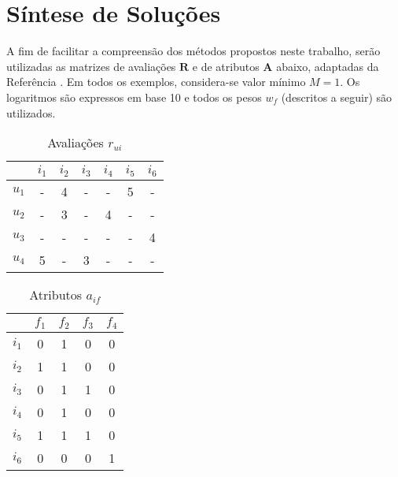 \chapter[Síntese de Soluções]{Síntese de Soluções}
\label{chap:sintese_de_solucoes}

A fim de facilitar a compreensão dos métodos propostos neste trabalho, serão utilizadas as matrizes de avaliações $\mathbf{R}$ e de atributos $\mathbf{A}$ abaixo, adaptadas da Referência . Em todos os exemplos, considera-se valor mínimo $M=1$. Os logaritmos são expressos em base 10 e todos os pesos $w_f$ (descritos a seguir) são utilizados.

\begin{table}[h]
\begin{center}
    \caption{Avaliações $r_{ui}$}
    \label{tab:rui_ref}
    \begin{tabular}{ | c | c | c | c | c | c | c | } 
    \hline
     & $i_1$ & $i_2$ & $i_3$ & $i_4$ & $i_5$ & $i_6$ \\ \hline
     $u_1$ & - & 4 & - & - & 5 & - \\ \hline
     $u_2$ & - & 3 & - & 4 & - & - \\ \hline
     $u_3$ & - & - & - & - & - & 4 \\ \hline
     $u_4$ & 5 & - & 3 & - & - & - \\ \hline
    \end{tabular}
\end{center}
\end{table}

\begin{table}[h]
\begin{center}
    \caption{Atributos $a_{if}$}
    \label{tab:aif_ref}
    \begin{tabular}{ | c | c | c | c | c | } 
    \hline
     & $f_1$ & $f_2$ & $f_3$ & $f_4$  \\ \hline
     $i_1$ & 0 & 1 & 0 & 0  \\ \hline
     $i_2$ & 1 & 1 & 0 & 0  \\ \hline
     $i_3$ & 0 & 1 & 1 & 0  \\ \hline
     $i_4$ & 0 & 1 & 0 & 0  \\ \hline
     $i_5$ & 1 & 1 & 1 & 0  \\ \hline
     $i_6$ & 0 & 0 & 0 & 1  \\ \hline
    \end{tabular}
\end{center}
\end{table}

